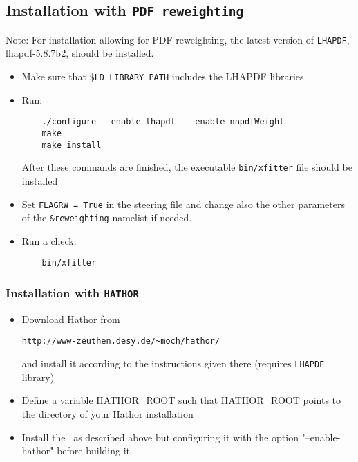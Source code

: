 \subsection{Installation with {\tt PDF reweighting}}\label{sec:install_nnpdfrweight}

Note: For installation allowing for PDF reweighting, the latest version of {\tt LHAPDF}, lhapdf-5.8.7b2, should be installed.

\begin{itemize}
\item Make sure that {\tt \$LD\_LIBRARY\_PATH} includes the LHAPDF libraries.
\item Run:
\begin{verbatim}
    ./configure --enable-lhapdf  --enable-nnpdfWeight
    make 
    make install
\end{verbatim}
After these commands are finished, the executable {\tt bin/xfitter} 
file should be installed
\item Set {\tt FLAGRW = True} in the steering file and change also the other parameters of the {\tt \&reweighting} namelist if needed.
\item  Run a check:
\begin{verbatim}
    bin/xfitter 
\end{verbatim}
\end{itemize}


\subsubsection{Installation with {\tt HATHOR}}

 \begin{itemize}
  \item Download Hathor from 
\begin{verbatim}
http://www-zeuthen.desy.de/~moch/hathor/
\end{verbatim}
     and install it according to the instructions given there
     (requires \verb'LHAPDF' library)

  \item Define a variable HATHOR\_ROOT  such that HATHOR\_ROOT  points to the
     directory of your Hathor installation

  \item Install the \fitter\ as described above but configuring it
     with the option "--enable-hathor" before building it
 \end{itemize}


